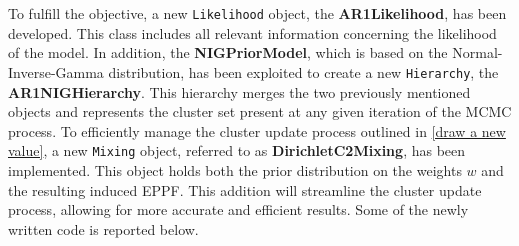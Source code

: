 \documentclass[12pt,a4paper]{article}
\begin{document}
To fulfill the objective, a new \texttt{Likelihood} object, the \textbf{AR1Likelihood}, has been developed. This class includes all relevant information concerning the likelihood of the model.  
In addition, the \textbf{NIGPriorModel}, which is based on the Normal-Inverse-Gamma distribution, has been exploited to create a new \texttt{Hierarchy}, the \textbf{AR1NIGHierarchy}. This hierarchy merges the two previously mentioned objects and represents the cluster set present at any given iteration of the MCMC process.  
To efficiently manage the cluster update process outlined in \autoref{draw a new value}, a new \texttt{Mixing} object, referred to as \textbf{DirichletC2Mixing}, has been implemented. This object holds both the prior distribution on the weights $w$ and the resulting induced EPPF. This addition will streamline the cluster update process, allowing for more accurate and efficient results.  
Some of the newly written code is reported below.

\end{document}
